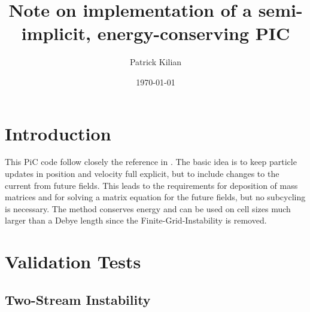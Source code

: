 \documentclass[%
preprint,
amsmath,amssymb,
aps,
]{revtex4-2}
\begin{document}

\title{Note on implementation of a semi-implicit, energy-conserving PIC}%


\author{Patrick Kilian}
%


\date{\today}%


\maketitle

\section{Introduction}

This PiC code follow closely the reference in \cite{LAPENTA2017349}. The basic
idea is to keep particle updates in position and velocity full explicit, but to
include changes to the current from future fields. This leads to the
requirements for deposition of mass matrices and for solving a matrix equation
for the future fields, but no subcycling is necessary. The method conserves
energy and can be used on cell sizes much larger than a Debye length since the
Finite-Grid-Instability is removed.

\section{Validation Tests}
\subsection{Two-Stream Instability}
\end{document}

